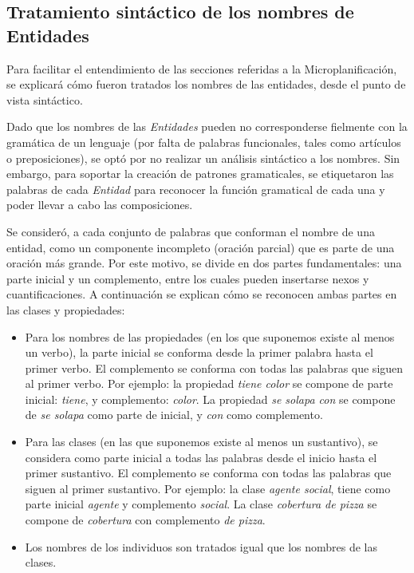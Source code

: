 \subsection{Tratamiento sintáctico de los nombres de Entidades}
Para facilitar el entendimiento de las secciones referidas a la Microplanificación, se explicará cómo fueron tratados los nombres de las entidades, desde el punto de vista sintáctico. 

Dado que los nombres de las\textit{ Entidades} pueden no corresponderse fielmente con la gramática de un lenguaje (por falta de palabras funcionales, tales como artículos o preposiciones), se optó por no realizar un análisis sintáctico a los nombres. Sin embargo, para soportar la creación de patrones gramaticales, se etiquetaron las palabras de cada \textit{Entidad }para reconocer la función gramatical de cada una y poder llevar a cabo las composiciones.

Se consideró, a cada conjunto de palabras que conforman el nombre de una entidad, como un componente incompleto (oración parcial) que es parte de una oración más grande. Por este motivo, se divide en dos partes fundamentales: una parte inicial y un complemento, entre los cuales pueden insertarse nexos y cuantificaciones. A continuación se explican cómo se reconocen ambas partes en las clases y propiedades:
\begin{itemize}
    \item Para los nombres de las propiedades (en los que suponemos existe al menos un verbo), la parte inicial se conforma desde la primer palabra hasta el primer verbo. El complemento se conforma con todas las palabras que siguen al primer verbo. Por ejemplo: la propiedad \emph{tiene color} se compone de parte inicial: \emph{tiene}, y complemento: \emph{color}. La propiedad \emph{se solapa con} se compone de \emph{se solapa} como parte de inicial, y \emph{con} como complemento.
    \item Para las clases (en las que suponemos existe al menos un sustantivo), se considera como parte inicial a todas las palabras desde el inicio hasta el primer sustantivo. El complemento se conforma con todas las palabras que siguen al primer sustantivo. Por ejemplo: la clase \emph{agente social}, tiene como parte inicial \emph{agente} y complemento \emph{social}. La clase \emph{cobertura de pizza} se compone de \emph{cobertura} con complemento \emph{de pizza}.
    \item Los nombres de los individuos son tratados igual que los nombres de las clases.
\end{itemize}


